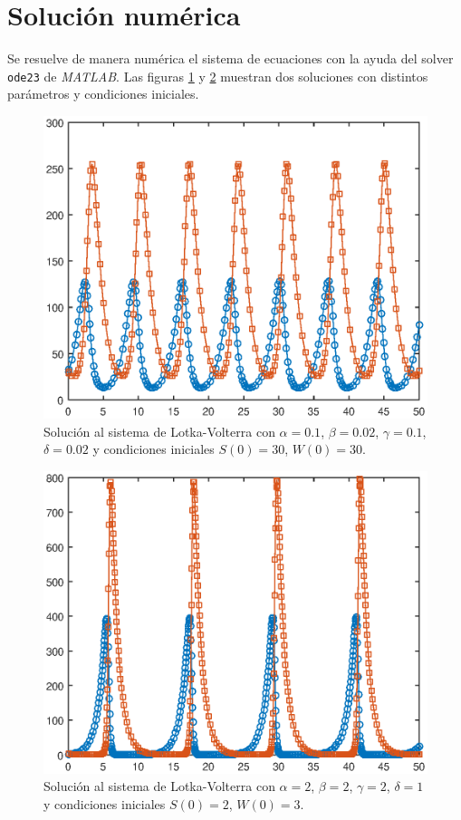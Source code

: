 \documentclass[12pt, twocolumn]{article}
\begin{document}
\section{Soluci\'on num\'erica}
\label{sec:solnum}

Se resuelve de manera num\'erica el sistema de ecuaciones con la ayuda del solver \texttt{ode23} de \textit{MATLAB}. Las figuras \ref{lotka1} y \ref{lotkac} muestran dos soluciones con distintos par\'ametros y condiciones iniciales. 

\begin{figure}
	\centering
	\includegraphics[scale=0.5]{lotka1.eps}
	\caption{Soluci\'on al sistema de Lotka-Volterra con $\alpha = 0.1$, $\beta = 0.02$, $\gamma = 0.1$, $\delta = 0.02$ y condiciones iniciales $S(0) = 30$, $W(0) = 30$.}
	\label{lotka1}
\end{figure}

\begin{figure}
	\centering
	\includegraphics[scale=0.5]{lotkac.eps}
	\caption{Soluci\'on al sistema de Lotka-Volterra con $\alpha = 2$, $\beta = 2$, $\gamma = 2$, $\delta = 1$ y condiciones iniciales $S(0) = 2$, $W(0) = 3$.}
	\label{lotkac}
\end{figure}
\end{document}
